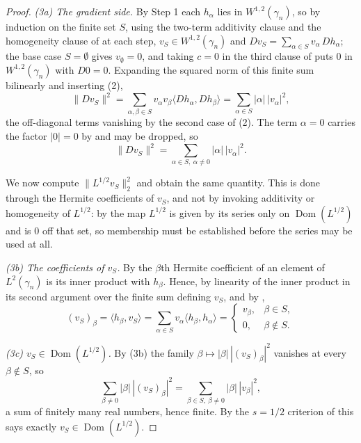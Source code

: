 \begin{proof}
\emph{(3a) The gradient side.}  By Step 1 each $h_\alpha$ lies in
$W^{1,2}(\gamma_n)$, so by induction on the finite set $S$, using the two-term
additivity clause and the homogeneity clause of  at each
step, $v_S \in W^{1,2}(\gamma_n)$ and
$D v_S = \sum_{\alpha\in S} v_\alpha\, Dh_\alpha$; the base case $S = \emptyset$
gives $v_\emptyset = 0$, and taking $c = 0$ in the third clause of
 puts $0$ in $W^{1,2}(\gamma_n)$ with $D0 = 0$.  Expanding
the squared norm of this finite sum bilinearly and inserting (2),
\[
  \|D v_S\|^2
    = \sum_{\alpha,\beta \in S} v_\alpha v_\beta \langle Dh_\alpha, Dh_\beta\rangle
    = \sum_{\alpha \in S} |\alpha|\,|v_\alpha|^2 ,
\]
the off-diagonal terms vanishing by the second case of (2).  The term $\alpha = 0$
carries the factor $|0| = 0$ by  and may be dropped, so
\begin{equation*}
  \|D v_S\|^2 = \sum_{\alpha \in S,\ \alpha \neq 0} |\alpha|\, |v_\alpha|^2 . \tag{3}
\end{equation*}

We now compute $\|L^{1/2}v_S\|_2^2$ and obtain the same quantity.  This is done
through the Hermite coefficients of $v_S$, and not by invoking additivity or
homogeneity of $L^{1/2}$: by  the map $L^{1/2}$ is given by its
series only on $\operatorname{Dom}(L^{1/2})$ and is $0$ off that set, so membership
must be established before the series may be used at all.

\emph{(3b) The coefficients of $v_S$.}  By  the $\beta$th
Hermite coefficient of an element of $L^2(\gamma_n)$ is its inner product with
$h_\beta$.  Hence, by linearity of the inner product in its second argument over
the finite sum defining $v_S$, and by ,
\[
  (v_S)_\beta = \langle h_\beta, v_S\rangle
    = \sum_{\alpha \in S} v_\alpha \langle h_\beta, h_\alpha\rangle
    = \begin{cases} v_\beta, & \beta \in S, \\ 0, & \beta \notin S. \end{cases}
\]

\emph{(3c) $v_S \in \operatorname{Dom}(L^{1/2})$.}  By (3b) the family
$\beta \mapsto |\beta|\,|(v_S)_\beta|^2$ vanishes at every $\beta \notin S$, so
\[
  \textstyle\sum_{\beta \neq 0} |\beta|\,|(v_S)_\beta|^2
    = \sum_{\beta \in S,\ \beta \neq 0} |\beta|\,|v_\beta|^2 ,
\]
a sum of finitely many real numbers, hence finite.  By the $s = 1/2$ criterion of
 this says exactly $v_S \in \operatorname{Dom}(L^{1/2})$.


\end{proof}
